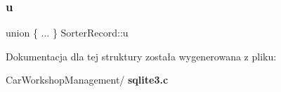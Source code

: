 \mbox{\label{struct_sorter_record_a6744a34e16545ee1c3976bdec173c86d}} 
\subsubsection{u}
{\footnotesize\ttfamily union \{ ... \}   Sorter\+Record\+::u}



Dokumentacja dla tej struktury została wygenerowana z pliku\+:\begin{DoxyCompactItemize}
\item 
Car\+Workshop\+Management/\textbf{ sqlite3.\+c}\end{DoxyCompactItemize}
